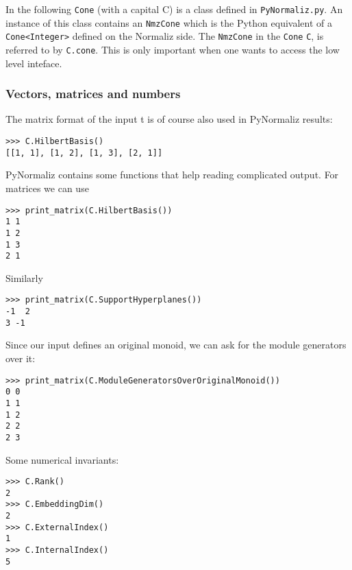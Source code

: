 \documentclass[12pt,a4paper]{scrartcl}
\theoremstyle{definition}
\begin{document}
\begin{small}
In the following \verb|Cone| (with a capital C) is a class defined in \verb|PyNormaliz.py|. An instance of this class contains an \verb|NmzCone| which is the Python equivalent of a \verb|Cone<Integer>| defined on the Normaliz side. The \verb|NmzCone| in the \verb|Cone| \verb|C|, is referred to by \verb|C.cone|. This is only important when one wants to access the low level inteface.

\subsubsection{Vectors, matrices and numbers}

The matrix format of the input t is of course also used in PyNormaliz results:
\begin{Verbatim}
>>> C.HilbertBasis()
[[1, 1], [1, 2], [1, 3], [2, 1]]
\end{Verbatim}
PyNormaliz contains some functions that help reading complicated output. For matrices we can use
\begin{Verbatim}
>>> print_matrix(C.HilbertBasis())
1 1
1 2
1 3
2 1
\end{Verbatim}
Similarly
\begin{Verbatim}
>>> print_matrix(C.SupportHyperplanes())
-1  2
3 -1
\end{Verbatim}
Since our input defines an original monoid, we can ask for the module generators over it:
\begin{Verbatim}
>>> print_matrix(C.ModuleGeneratorsOverOriginalMonoid())
0 0
1 1
1 2
2 2
2 3
\end{Verbatim}
Some numerical invariants:
\begin{Verbatim}
>>> C.Rank()
2
>>> C.EmbeddingDim()
2
>>> C.ExternalIndex()
1
>>> C.InternalIndex()
5
\end{Verbatim}


\end{small}
\end{document}
